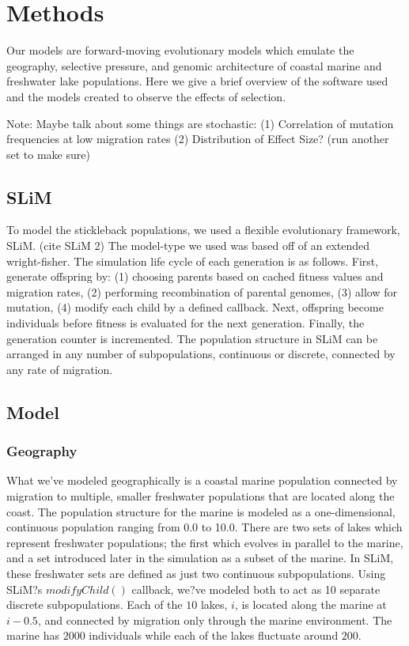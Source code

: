 \documentclass{article}
\begin{document}
\section{Methods}

Our models are forward-moving evolutionary models which
emulate the geography, selective pressure, and genomic architecture 
of coastal marine and freshwater lake populations. 
Here we give a brief overview of the software used and the models created to observe the effects of selection. 


Note: Maybe talk about some things are stochastic: 
(1) Correlation of mutation frequencies at low migration rates
(2) Distribution of Effect Size? (run another set to make sure)

\subsection{SLiM}

To model the stickleback populations, we used a flexible evolutionary framework, SLiM. (cite SLiM 2) 
The model-type we used was based off of an extended wright-fisher. 
The simulation life cycle of each generation is as follows.
First, 
generate offspring by:
(1) choosing parents based on cached fitness values and migration rates, 
(2) performing recombination of parental genomes, 
(3) allow for mutation, 
(4) modify each child by a defined callback. 
Next, 
offspring become individuals before fitness is evaluated for the next generation.
Finally,
the generation counter is incremented. 
The population structure in SLiM can be arranged in any number of subpopulations, 
continuous or discrete, connected by any rate of migration. 


\subsection{Model}

\subsubsection{Geography}

What we've modeled geographically is a coastal marine population 
connected by migration to multiple, smaller freshwater populations that are located along the coast.
The population structure for the marine is modeled as a one-dimensional, continuous population
ranging from 0.0 to 10.0.
There are two sets of lakes which represent freshwater populations; 
the first which evolves in parallel to the marine, 
and a set introduced later in the simulation as a subset of the marine. 
In SLiM, these freshwater sets are defined as just two continuous subpopulations. 
Using SLiM?s $modifyChild()$ callback, we?ve modeled both to act as 10 separate discrete subpopulations. 
Each of the $10$ lakes, $i$, is located along the marine at $i - 0.5$, 
and connected by migration only through the marine environment. 
The marine has $2000$ individuals while 
each of the lakes fluctuate around $200$. 
\end{document}
